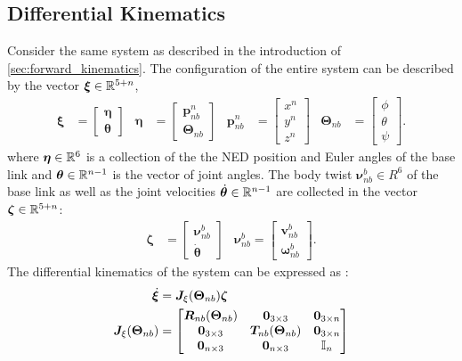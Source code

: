 \subsection{Differential Kinematics}
Consider the same system as described in the introduction of \autoref{sec:forward_kinematics}.
The configuration of the entire system can be described by the vector $\bm{\xi} \in \mathbb{R}^{5+n}$,
\begin{align}
    \bm{\xi} &= \begin{bmatrix}\bm{\eta} \\ \bm{\theta} \end{bmatrix} &
        \bm{\eta} &= \begin{bmatrix}\bm{p}_{nb}^n \\ \bm{\Theta}_{nb} \end{bmatrix} &
            \bm{p}_{nb}^n &= \begin{bmatrix}x^n \\ y^n \\ z^n \end{bmatrix} &
        \bm{\Theta}_{nb} &= \begin{bmatrix}\phi \\ \theta \\ \psi \end{bmatrix}.
\end{align}
where $\bm{\eta} \in \mathbb{R}^6$ is a collection of the the NED position and Euler angles of the base
link and $\bm{\theta} \in \mathbb{R}^{n-1}$ is the vector of joint angles. The body twist $\bm{\nu}_{nb}^b \in R^6$ of the base link as well as the joint velocities $\dot{\bm{\theta}} \in \mathbb{R}^{n-1}$ are collected in the vector $\bm{\zeta} \in \mathbb{R}^{5+n}$:
\begin{align}
    \bm{\zeta} &= \begin{bmatrix}\bm{\nu}_{nb}^b \\ \dot{\bm{\theta}}\end{bmatrix} &
        \bm{\nu}_{nb}^b = \begin{bmatrix} \bm{v}_{nb}^b \\ \bm{\omega}_{nb}^b\end{bmatrix}.
\end{align}
The differential kinematics of the system can be expressed as \cite{fossen2021}:
\begin{subequations}
\begin{align}
    \dot{\bm{\xi}} &= \bm{J}_{\xi}(\bm{\Theta}_{nb})\bm{\zeta} \\
    \bm{J}_{\xi}(\bm{\Theta}_{nb}) &= \begin{bmatrix}
        \bm{R}_{nb}(\bm{\Theta}_{nb}) & \bm{0}_{3 \times 3} & \bm{0}_{3 \times n} \\
        \bm{0}_{3 \times 3} & \bm{T}_{nb}(\bm{\Theta}_{nb}) & \bm{0}_{3 \times n} \\
        \bm{0}_{n \times 3} & \bm{0}_{n \times 3} & \mathbb{I}_{n}
    \end{bmatrix}
\end{align}
\end{subequations}
